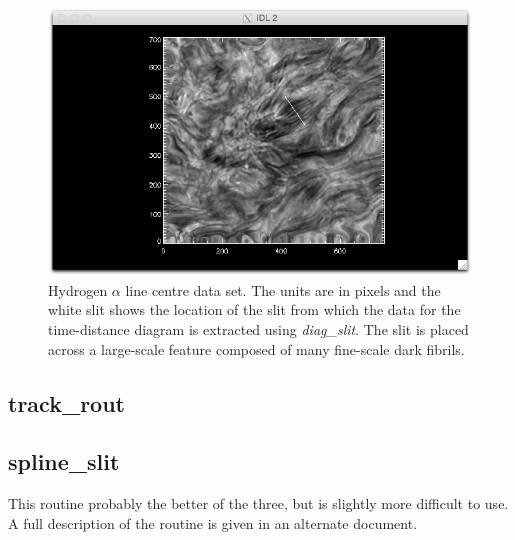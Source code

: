 \documentclass{article}
\begin{document}
\begin{figure}
\centering
\includegraphics[scale=0.6, clip=true, viewport=4.5cm 0.cm 20.cm 14.7cm]{slit_example2.png}  
\caption{Hydrogen $\alpha$ line centre data set. The units are in pixels and the white slit shows the location of the slit from which the data for the time-distance diagram is extracted using \textit{diag\_slit}. The slit is placed across a large-scale feature composed of many fine-scale dark fibrils.
}\label{fig:slit_pick}
\end{figure}



\subsection{track\_rout}


\subsection{spline\_slit}
This routine probably the better of the three, but is slightly more difficult to use. A full description of the routine is given in an alternate document.
\end{document}
